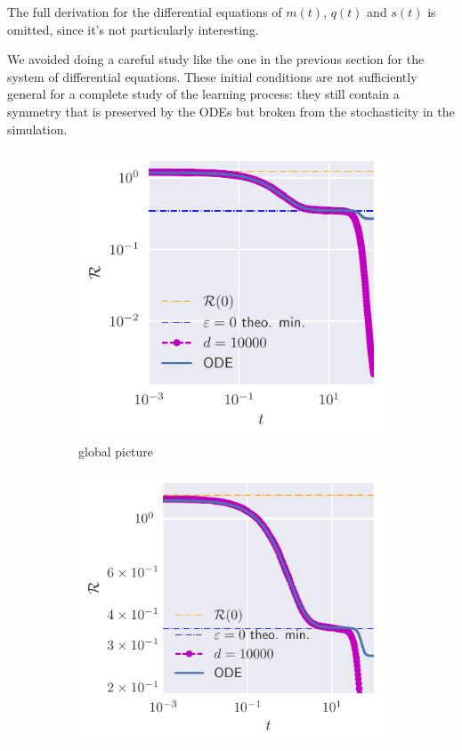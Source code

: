 The full derivation for the differential equations of \(m{(t)}\), \(q{(t)}\) and \(s{(t)}\) is 
omitted, since it's not particularly interesting. 

We avoided doing a careful study like the one in the previous section for the system of differential equations.
These initial conditions are not sufficiently general for a complete study of the learning process:
they still contain a symmetry that is preserved by the ODEs but broken from the 
stochasticity in the simulation. 
\begin{figure}
  \centering
  \begin{subfigure}{0.495\textwidth}
    \includegraphics[width=1.\textwidth]{figures/example-small-eps.pdf}
    \caption{global picture}
  \end{subfigure}
  \begin{subfigure}{0.495\textwidth}
    \includegraphics[width=1.\textwidth]{figures/example-small-eps-zoom.pdf}

\end{subfigure}
\end{figure}
